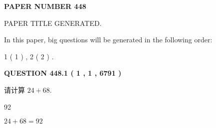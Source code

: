 \documentclass{ctexart}
\begin{document}
   
   
   
\newpage 
\setcounter{page}{ 
   448001 } 
   
   
   
   
 {\textbf{ \Large{ PAPER NUMBER  448  }}}
   
   
\vspace{0.2in}
   
   
   
   
   
   
   
   
 \vspace{0.2in}
 
 
 
 
   
   
 PAPER TITLE GENERATED.
   
   
   
\vspace{0.2in}
   
In this paper, big questions will be generated in the following order: 
   
   
   1 ( 1 )
 ,
   2 ( 2 )
 .
  
\vspace{0.2in}
  
{\textbf{\Large{QUESTION
448.1 
 ( 1 , 1 , 6791 )
}}}
  
  
 
请计算 $ %
24 +  %
68 $.
 
 
 
\noindent{}
 
 

92
 
 
\noindent{}
 
 

 
 
 
\noindent{}
 
 

$ %
24 +  %
68=   %
92$
 
 
\noindent{}
 
 

 
   
   
   
\end{document}
